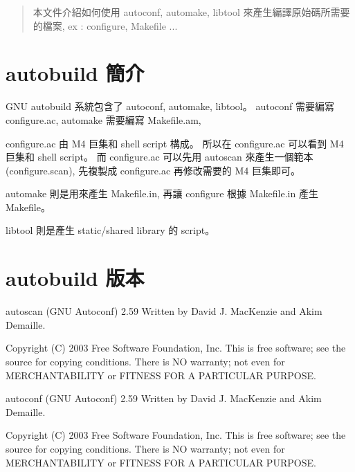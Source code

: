 \documentclass[12pt,a4]{article}
\begin{document}
\renewcommand{\abstractname}{摘要}
\renewcommand{\figurename}{圖}
\renewcommand{\contentsname}{目錄}
\begin{CJK}{UTF8}{cwmu} %



\newpage
\tableofcontents
{}
\newpage


\begin{abstract}
本文件介紹如何使用 autoconf, automake, libtool
來產生編譯原始碼所需要的檔案, ex : configure, Makefile ...
\end{abstract}
\newpage

\section{autobuild 簡介}
GNU autobuild 系統包含了 autoconf, automake, libtool。
autoconf 需要編寫 configure.ac,
automake 需要編寫 Makefile.am,

configure.ac 由 M4 巨集和 shell script 構成。
所以在 configure.ac 可以看到 M4 巨集和 shell script。
而 configure.ac 可以先用 autoscan 來產生一個範本 (configure.scan),
先複製成 configure.ac 再修改需要的 M4 巨集即可。

automake 則是用來產生 Makefile.in, 再讓 configure 根據 Makefile.in
產生 Makefile。

libtool 則是產生 static/shared library 的 script。

\section{autobuild 版本}

autoscan (GNU Autoconf) 2.59
Written by David J. MacKenzie and Akim Demaille.

Copyright (C) 2003 Free Software Foundation, Inc.
This is free software; see the source for copying conditions.  There is NO
warranty; not even for MERCHANTABILITY or FITNESS FOR A PARTICULAR PURPOSE.


autoconf (GNU Autoconf) 2.59
Written by David J. MacKenzie and Akim Demaille.

Copyright (C) 2003 Free Software Foundation, Inc.
This is free software; see the source for copying conditions.  There is NO
warranty; not even for MERCHANTABILITY or FITNESS FOR A PARTICULAR PURPOSE.




\end{CJK}
\end{document}
